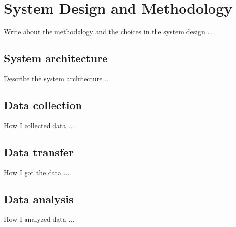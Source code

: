 \chapter{System Design and Methodology}
\label{cha:system}
\vspace{0.5 cm} 

Write about the methodology and the choices in the system design ...


\vspace{0.5 cm} 
\section{System architecture}
\label{sec:sysarc}
\vspace{0.5 cm} 

Describe the system architecture ...


\vspace{0.5 cm} 
\section{Data collection}
\label{sec:collection}
\vspace{0.5 cm} 

How I collected data ...


\vspace{0.5 cm} 
\section{Data transfer}
\label{sec:transfer}
\vspace{0.5 cm} 

How I got the data ...


\vspace{0.5 cm} 
\section{Data analysis}
\label{sec:analysis}
\vspace{0.5 cm} 

How I analyzed data ...
